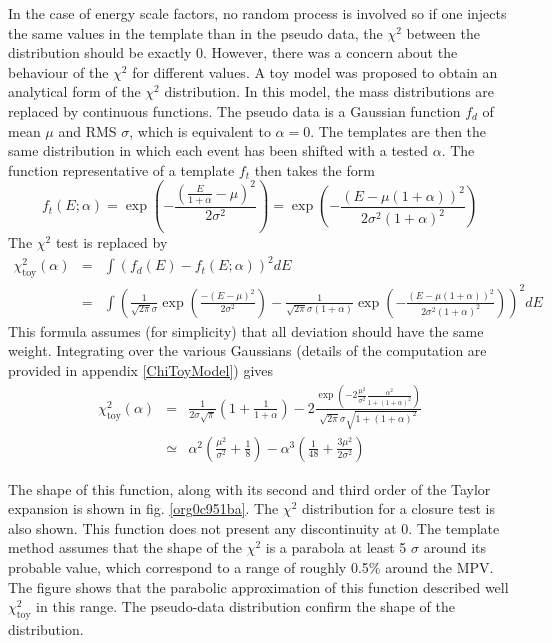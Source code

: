 \begin{enumerate}
In the case of energy scale factors, no random process is involved so if one injects the same values in the template than in the pseudo data, the $\chi^2$ between the distribution should be exactly 0.
However, there was a concern about the behaviour of the $\chi^2$ for different values.
A toy model was proposed to obtain an analytical form of the $\chi^2$ distribution.
In this model, the mass distributions are replaced by continuous functions.
The pseudo data is a Gaussian function \(f_d\) of mean \(\mu\) and RMS \(\sigma\), which is equivalent to $\alpha=0$.
The templates are then the same distribution in which each event has been shifted with a tested $\alpha$.
The function representative of a template \(f_t\)  then takes the form
\begin{equation}
f_t (E; \alpha) =
\exp\left( -\frac{\left(\frac{E}{1+\alpha}-\mu\right)^2}{2\sigma^2}\right)
=
\exp\left( -\frac{(E-\mu(1+\alpha))^2}{2\sigma^2(1+\alpha)^2}\right)
\label{eq:Calibration_scaleShape}
\end{equation}
The $\chi^2$ test is replaced by
\begin{equation}
\begin{array}{lcl}
\chi^2_{\text{toy}}(\alpha) &=& \int ( f_d(E) - f_t(E;\alpha))^2 dE \\
&=& \int ( \frac{1}{\sqrt{2\pi}\sigma}\exp\left( \frac{-(E-\mu)^2}{2\sigma^2} \right) - \frac{1}{\sqrt{2\pi}\sigma (1+\alpha)}\exp\left( -\frac{(E-\mu(1+\alpha))^2}{2\sigma^2(1+\alpha)^2}\right) )^2 dE
\end{array}
\end{equation}
This formula assumes (for simplicity) that all deviation should have the same weight.
Integrating over the various Gaussians (details of the computation are provided in appendix \ref{ChiToyModel}) gives
\begin{equation}
\begin{array}{lcl}
\chi^2_{\text{toy}}(\alpha) &=& \frac{1}{2\sigma\sqrt{\pi}}(1 + \frac{1}{1+\alpha} ) -2   \frac{\exp\left(-2 \frac{\mu^2}{\sigma^2} \frac{\alpha^2}{1+(1+\alpha)^2}\right)}{\sqrt{2\pi}\sigma\sqrt{1+(1+\alpha)^2}}  \\
&\simeq & \alpha^2( \frac{\mu^2}{\sigma^2} + \frac{1}{8}) - \alpha^3 ( \frac{1}{48} + \frac{3\mu^2}{2\sigma^2})
\end{array}
\end{equation}

The shape of this function, along with its second and third order of the Taylor expansion is shown in fig. \ref{org0c951ba}.
The $\chi^2$ distribution for a closure test is also shown.
This function does not present any discontinuity at 0.
The template method assumes that the shape of the $\chi^2$ is a parabola at least 5 \(\sigma\) around its probable value, which correspond to a range of roughly 0.5\% around the MPV.
The figure shows that the parabolic approximation of this function described well \(\chi^{\text{2}}_{\text{toy}}\) in this range.
The pseudo-data distribution confirm the shape of the distribution.


\end{enumerate}
